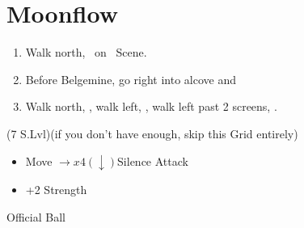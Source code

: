 \chapter{Moonflow}

\begin{enumerate}
	\item Walk north, \sd\ on \kimahri\ Scene.
	\item Before Belgemine, go right into alcove and 
	\item Walk north, \sd, walk left, \sd, walk left past 2 screens, \sd.
\end{enumerate}
\begin{spheregrid}
	\begin{itemize}
		\wakkaf (7 S.Lvl)(if you don't have enough, skip this Grid entirely)
		\begin{itemize}
			\item Move $\rightarrow x4 (\downarrow)$Silence Attack
			\item +2 Strength
		\end{itemize}
	\end{itemize}
\end{spheregrid}
\begin{equip}
    \begin{itemize}
        \wakkaf Official Ball
    \end{itemize}
\end{equip}
